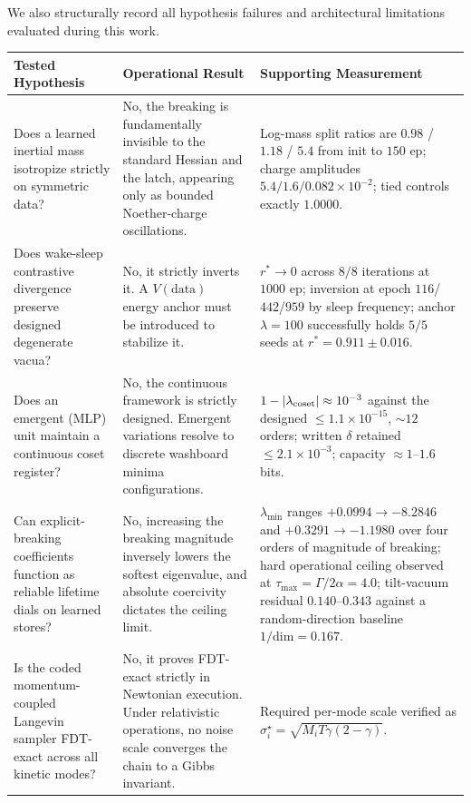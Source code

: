 \documentclass[mlabstract,onecolumn]{jmlr}
\begin{document}
We also structurally record all hypothesis failures and architectural limitations evaluated during this work.

\begin{center}
\begin{tabular}{@{}p{1.52in} p{1.52in} p{2.06in}@{}}
\toprule
Tested Hypothesis & Operational Result & Supporting Measurement \\
\midrule
Does a learned inertial mass isotropize strictly on symmetric data? &
No, the breaking is fundamentally invisible to the standard Hessian and the latch, appearing only as bounded Noether-charge oscillations. &
Log-mass split ratios are $0.98$ / $1.18$ / $5.4$ from init to $150$ ep; charge amplitudes $5.4/1.6/0.082{\times}10^{-2}$; tied controls exactly $1.0000$. \\[2pt]
Does wake-sleep contrastive divergence preserve designed degenerate vacua? &
No, it strictly inverts it. A $V(\text{data})$ energy anchor must be introduced to stabilize it. &
$r^*\to0$ across $8/8$ iterations at $1000$ ep; inversion at epoch $116$/$442$/$959$ by sleep frequency; anchor $\lambda{=}100$ successfully holds $5/5$ seeds at $r^*{=}0.911\pm0.016$. \\[2pt]
Does an emergent (MLP) unit maintain a continuous coset register? &
No, the continuous framework is strictly designed. Emergent variations resolve to discrete washboard minima configurations. &
$1-|\lambda_{\rm coset}|\approx10^{-3}$ against the designed $\le1.1{\times}10^{-15}$, $\sim\!12$ orders; written $\delta$ retained $\le2.1{\times}10^{-3}$; capacity $\approx1$--$1.6$ bits. \\[2pt]
Can explicit-breaking coefficients function as reliable lifetime dials on learned stores? &
No, increasing the breaking magnitude inversely lowers the softest eigenvalue, and absolute coercivity dictates the ceiling limit. &
$\lambda_{\min}$ ranges $+0.0994\to-8.2846$ and $+0.3291\to-1.1980$ over four orders of magnitude of breaking; hard operational ceiling observed at $\tau_{\max}=\Gamma/2\alpha=4.0$; tilt-vacuum residual $0.140$--$0.343$ against a random-direction baseline $1/\mathrm{dim}=0.167$. \\[2pt]
Is the coded momentum-coupled Langevin sampler FDT-exact across all kinetic modes? &
No, it proves FDT-exact strictly in Newtonian execution. Under relativistic operations, no noise scale converges the chain to a Gibbs invariant. &
Required per-mode scale verified as $\sigma^\star_i=\sqrt{M_iT\gamma(2-\gamma)}$. \\[2pt]
\bottomrule
\end{tabular}
\end{center}
\end{document}

